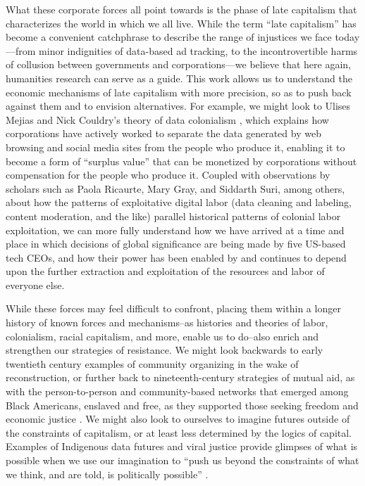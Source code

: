 What these corporate forces all point towards is the phase of late capitalism that characterizes the world in which we all live. While the term ``late capitalism'' has become a convenient catchphrase to describe the range of injustices we face today---from minor indignities of data-based ad tracking, to the incontrovertible harms of collusion between governments and corporations---we believe that here again, humanities research can serve as a guide. This work allows us to understand the economic mechanisms of late capitalism with more precision, so as to push back against them and to envision alternatives. For example, we might look to Ulises Mejias and Nick Couldry’s theory of data colonialism \cite{Couldry_Mejias_2019}, which explains how corporations have actively worked to separate the data generated by web browsing and social media sites from the people who produce it, enabling it to become a form of ``surplus value'' that can be monetized by corporations without compensation for the people who produce it. Coupled with observations by scholars such as Paola Ricaurte, Mary Gray, and Siddarth Suri, among others, about how the patterns of exploitative digital labor (data cleaning and labeling, content moderation, and the like) parallel historical patterns of colonial labor exploitation, we can more fully understand how we have arrived at a time and place in which decisions of global significance are being made by five US-based tech CEOs, and how their power has been enabled by and continues to depend upon the further extraction and exploitation of the resources and labor of everyone else.   

While these forces may feel difficult to confront, placing them within a longer history of known forces and mechanisms–as histories and theories of labor, colonialism, racial capitalism, and more, enable us to do–also enrich and strengthen our strategies of resistance. We might look backwards to early twentieth century examples of community organizing in the wake of reconstruction, or further back to nineteenth-century strategies of mutual aid, as with the person-to-person and community-based networks that emerged among Black Americans, enslaved and free, as they supported those seeking freedom and economic justice \cite{Colored}. We might also look to ourselves to imagine futures outside of the constraints of capitalism, or at least less determined by the logics of capital. Examples of Indigenous data futures \cite{harjo_spiral_2019,brown_2023} and viral justice \cite{benjamin_viral_2022} provide glimpses of what is possible when we use our imagination to ``push us beyond the constraints of what we think, and are told, is politically possible'' \citep{benjamin_imagination_2024}.